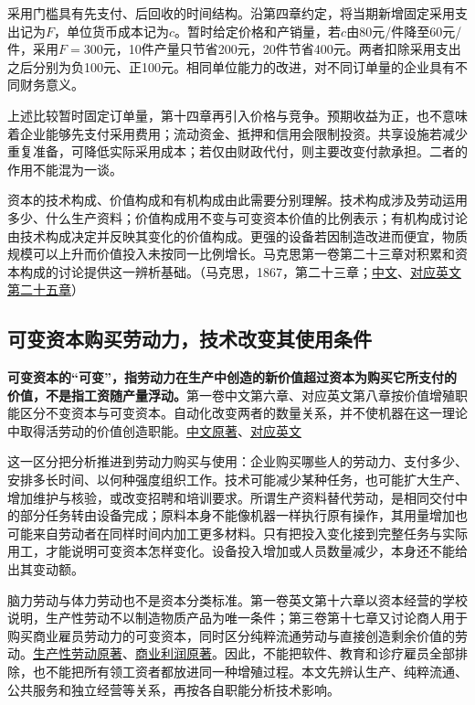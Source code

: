 \documentclass[UTF8,fontset=windows,12pt,a4paper,oneside,openany]{ctexbook}
\begin{document}
采用门槛具有先支付、后回收的时间结构。沿第四章约定，将当期新增固定采用支出记为$F$，单位货币成本记为$c$。暂时给定价格和产销量，若$c$由80元/件降至60元/件，采用$F=300$元，10件产量只节省200元，20件节省400元。两者扣除采用支出之后分别为负100元、正100元。相同单位能力的改进，对不同订单量的企业具有不同财务意义。

上述比较暂时固定订单量，第十四章再引入价格与竞争。预期收益为正，也不意味着企业能够先支付采用费用；流动资金、抵押和信用会限制投资。共享设施若减少重复准备，可降低实际采用成本；若仅由财政代付，则主要改变付款承担。二者的作用不能混为一谈。

资本的技术构成、价值构成和有机构成由此需要分别理解。技术构成涉及劳动运用多少、什么生产资料；价值构成用不变与可变资本价值的比例表示；有机构成讨论由技术构成决定并反映其变化的价值构成。更强的设备若因制造改进而便宜，物质规模可以上升而价值投入未按同一比例增长。马克思第一卷第二十三章对积累和资本构成的讨论提供这一辨析基础。（马克思，1867，第二十三章；\href{https://www.marxists.org/chinese/marx-engels/23/034.htm}{中文}、\href{https://www.marxists.org/archive/marx/works/1867-c1/ch25.htm}{对应英文第二十五章}）

\subsection{可变资本购买劳动力，技术改变其使用条件}\label{sec:variable-capital}

\textbf{可变资本的“可变”，指劳动力在生产中创造的新价值超过资本为购买它所支付的价值，不是指工资随产量浮动。}第一卷中文第六章、对应英文第八章按价值增殖职能区分不变资本与可变资本。自动化改变两者的数量关系，并不使机器在这一理论中取得活劳动的价值创造职能。\href{https://www.marxists.org/chinese/marx-engels/23/016.htm}{中文原著}、\href{https://www.marxists.org/archive/marx/works/1867-c1/ch08.htm}{对应英文}

这一区分把分析推进到劳动力购买与使用：企业购买哪些人的劳动力、支付多少、安排多长时间、以何种强度组织工作。技术可能减少某种任务，也可能扩大生产、增加维护与核验，或改变招聘和培训要求。所谓生产资料替代劳动，是相同交付中的部分任务转由设备完成；原料本身不能像机器一样执行原有操作，其用量增加也可能来自劳动者在同样时间内加工更多材料。只有把投入变化接到完整任务与实际用工，才能说明可变资本怎样变化。设备投入增加或人员数量减少，本身还不能给出其变动额。

脑力劳动与体力劳动也不是资本分类标准。第一卷英文第十六章以资本经营的学校说明，生产性劳动不以制造物质产品为唯一条件；第三卷第十七章又讨论商人用于购买商业雇员劳动力的可变资本，同时区分纯粹流通劳动与直接创造剩余价值的劳动。\href{https://www.marxists.org/archive/marx/works/1867-c1/ch16.htm}{生产性劳动原著}、\href{https://www.marxists.org/archive/marx/works/1894-c3/ch17.htm}{商业利润原著}。因此，不能把软件、教育和诊疗雇员全部排除，也不能把所有领工资者都放进同一种增殖过程。本文先辨认生产、纯粹流通、公共服务和独立经营等关系，再按各自职能分析技术影响。
\end{document}
